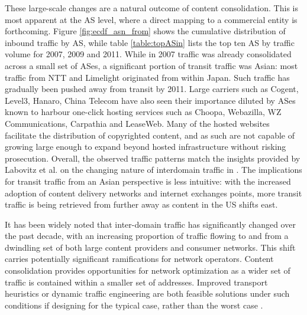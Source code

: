 

These large-scale changes are a natural outcome of content consolidation. This is most apparent at the AS level, where a direct mapping to a commercial entity is forthcoming.
Figure \ref{fig:ecdf_asn_from} shows the cumulative distribution of inbound traffic by AS, while table \ref{table:topASin} lists the top ten AS by traffic volume for 2007, 2009 and 2011.
While in 2007 traffic was already consolidated across a small set of ASes, a significant portion of transit traffic was Asian: most traffic from NTT and Limelight originated from within Japan. Such traffic has gradually been pushed away from transit by 2011.
Large carriers such as Cogent, Level3, Hanaro, China Telecom have also seen their importance diluted by ASes known to harbour one-click hosting services such as Choopa, Webazilla, WZ Communications, Carpathia and LeaseWeb.
Many of the hosted websites facilitate the distribution of copyrighted content, and as such are not capable of growing large enough to expand beyond hosted infrastructure without risking prosecution.
Overall, the observed traffic patterns match the insights provided by Labovitz et al. on the changing nature of interdomain traffic in \cite{Labovitz:2010p175}.
The implications for transit traffic from an Asian perspective is less intuitive: with the increased adoption of content delivery networks and internet exchanges points, more transit traffic is being retrieved from further away as content in the US shifts east.


It has been widely noted that inter-domain traffic has significantly changed over the past decade, with an increasing proportion of traffic flowing to and from a dwindling set of both large content providers and consumer networks. 
This shift carries potentially significant ramifications for network operators. 
Content consolidation provides opportunities for network optimization as a wider set of traffic is contained within a smaller set of addresses. 
Improved transport heuristics or dynamic traffic engineering are both feasible solutions under such conditions if designing for the typical case, rather than the worst case \cite{Dukki}.

